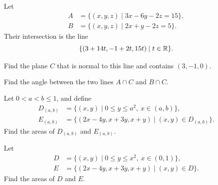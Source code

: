 \begin{problem}
Let
\[
\begin{aligned}
A&=\{(x, y, z)\mid 3x-6y-2z=15\}, \\
B&=\{(x, y, z)\mid 2x+y-2z=5\}.
\end{aligned}
\]
Their intersection is the line
\[
\{(3+14t, -1+2t, 15t)\mid t\in\mathbb{R}\}.
\]
\begin{problemsubparts}
\item Find the plane $C$ that is normal to this line and contains $(3, -1, 0)$.
\item Find the angle between the two lines $A\cap C$ and $B\cap C$.
\end{problemsubparts}
\end{problem}

\begin{problem}
\begin{problemsubparts}
\item Let $0<a<b\le1$, and define
\[
\begin{aligned}
D_{(a, b)}&=\{(x, y)\mid 0\le y\le a^2, \ x\in(a, b)\}, \\
E_{(a, b)}&=\{(2x-4y, x+3y, x+y)\mid (x, y)\in D_{(a, b)}\}.
\end{aligned}
\]
Find the areas of $D_{(a, b)}$ and $E_{(a, b)}$.
\item Let
\[
\begin{aligned}
D&=\{(x, y)\mid 0\le y\le x^2, \ x\in(0, 1)\}, \\
E&=\{(2x-4y, x+3y, x+y)\mid (x, y)\in D\}.
\end{aligned}
\]
Find the areas of $D$ and $E$.
\end{problemsubparts}
\end{problem}

